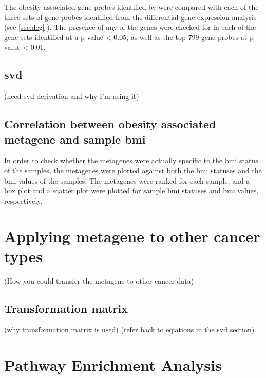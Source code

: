 The obesity associated gene probes identified by \citet{Creighton2012} were compared with each of the three sets of gene probes identified from the differential gene expression analysis (see \cref{sec:deg} ).
The presence of any of the \citet{Creighton2012} genes were checked for in each of the gene sets identified at a p-value \textless{} 0.05, as well as the top 799 gene probes at p-value \textless{} 0.01.

\subsection{\gls{svd}}
\label{subsec:svd}

(need svd derivation and why I'm using it)

\subsection{Correlation between obesity associated metagene and sample \gls{bmi}}
\label{subsec:metavsbmi}

In order to check whether the metagenes were actually specific to the \gls{bmi} status of the samples, the metagenes were plotted against both the \gls{bmi} statuses and the \gls{bmi} values of the samples.
The metagenes were ranked for each sample, and a box plot and a scatter plot were plotted for sample \gls{bmi} statuses and \gls{bmi} values, respectively.

\section{Applying metagene to other cancer types}
\label{sec:metagene}

(How you could transfer the metagene to other cancer data)

\subsection{Transformation matrix}
\label{subsec:transmat}

(why transformation matrix is used)
(refer back to eqiations in the  svd section)

\section{Pathway Enrichment Analysis}
\label{sec:pathenrich}







